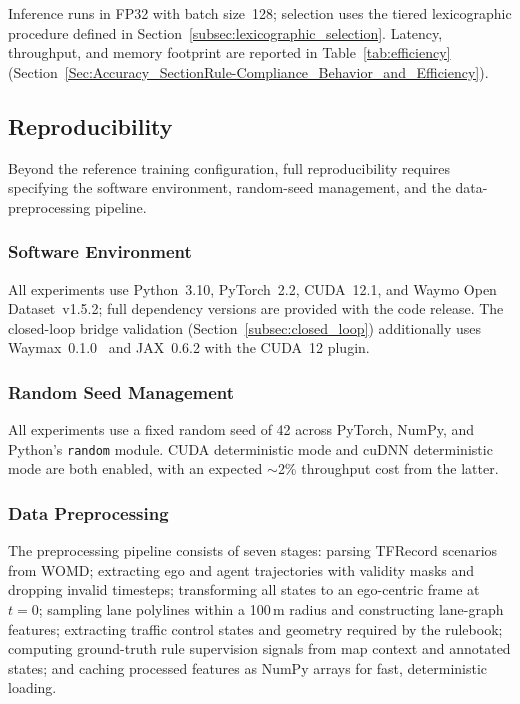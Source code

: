 Inference runs in FP32 with batch size~128; selection uses the tiered lexicographic procedure defined in Section~\ref{subsec:lexicographic_selection}. Latency, throughput, and memory footprint are reported in Table~\ref{tab:efficiency} (Section~\ref{Sec:Accuracy_SectionRule-Compliance_Behavior_and_Efficiency}).

\subsection{Reproducibility}
\label{subsec:reproducibility}

Beyond the reference training configuration, full reproducibility requires specifying the software environment, random-seed management, and the data-preprocessing pipeline.

\subsubsection{Software Environment}

All experiments use Python~3.10, PyTorch~2.2, CUDA~12.1, and Waymo Open Dataset~v1.5.2; full dependency versions are provided with the code release. The closed-loop bridge validation (Section~\ref{subsec:closed_loop}) additionally uses Waymax~0.1.0~\cite{gulino2024waymax} and JAX~0.6.2 with the CUDA~12 plugin.

\subsubsection{Random Seed Management}

All experiments use a fixed random seed of 42 across PyTorch, NumPy, and Python's \texttt{random} module.  CUDA deterministic mode and cuDNN deterministic mode are both enabled, with an expected $\sim$2\% throughput cost from the latter.

\subsubsection{Data Preprocessing}

The preprocessing pipeline consists of seven stages: parsing TFRecord scenarios from WOMD; extracting ego and agent trajectories with validity masks and dropping invalid timesteps; transforming all states to an ego-centric frame at $t{=}0$; sampling lane polylines within a 100\,m radius and constructing lane-graph features; extracting traffic control states and geometry required by the rulebook; computing ground-truth rule supervision signals from map context and annotated states; and caching processed features as NumPy arrays for fast, deterministic loading.

